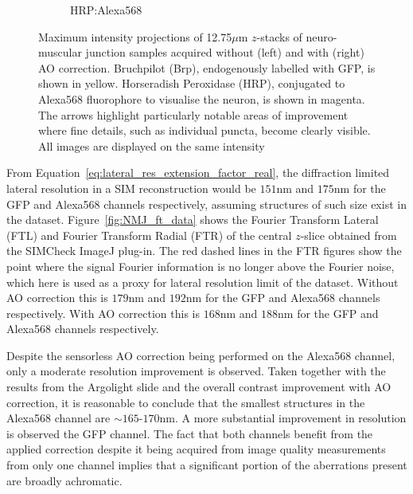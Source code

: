 \begin{figure}
\begin{subfigure}[t]{0.24\textwidth}
		\caption{HRP:Alexa568}
		\label{fig:DeepSIM_NMJ_AO_ROI2_Alexa568}
	\end{subfigure}
	\caption[Live \textit{Drosophila} neuro-muscular junction 
	data acquired on the DeepSIM imaging system]{Maximum intensity 
		projections of 12.75$\mu$m $z$-stacks of neuro-muscular junction samples acquired without (left) and with (right) AO correction. Bruchpilot (Brp), endogenously labelled with GFP, is shown in yellow. Horseradish Peroxidase (HRP), conjugated to Alexa568 
		fluorophore to visualise the neuron, is shown in magenta. The arrows highlight particularly notable areas of improvement where fine details, such as individual puncta, become clearly visible. All images are displayed on the same intensity}
	\label{fig:DeepSIM_NMJ_data}
\end{figure}

From Equation~\ref{eq:lateral_res_extension_factor_real}, the diffraction 
limited lateral resolution in a SIM reconstruction would be $151$nm and 
$175$nm for the GFP and Alexa568 channels respectively, assuming structures 
of such size exist in the dataset. Figure~\ref{fig:NMJ_ft_data} shows the 
Fourier Transform Lateral (FTL) and Fourier Transform Radial (FTR) of the 
central $z$-slice obtained from the SIMCheck ImageJ 
plug-in\cite{ball2015simcheck}. The red dashed lines in the FTR figures 
show the point where the signal Fourier information is no longer above the 
Fourier noise, which here is used as a proxy for lateral resolution limit 
of the dataset. Without AO correction this is $179$nm and $192$nm for the GFP 
and Alexa568 channels respectively. With AO correction this is $168$nm and 
$188$nm for the GFP and Alexa568 channels respectively. 

Despite the sensorless AO correction being performed on the Alexa568 
channel, only a moderate resolution improvement is observed. Taken 
together with the results from the Argolight slide and the overall contrast 
improvement with AO correction, it is reasonable to conclude that the 
smallest structures in the Alexa568 channel are $\sim165$-$170$nm. A more 
substantial improvement in resolution is observed the GFP channel. The fact 
that both channels benefit from the applied correction despite it being 
acquired from image quality measurements from only one channel implies that 
a significant portion of the aberrations present are broadly achromatic.


